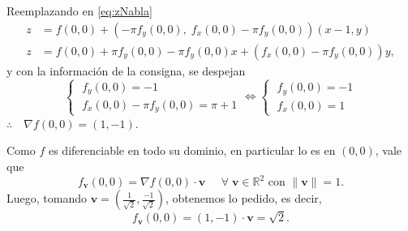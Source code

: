 \begin{solution}
Reemplazando en \eqref{eq:zNabla}
   \begin{align*}
    z&= f(0,0)+\left(-\pi f_y(0,0),\;f_x(0,0)-\pi f_y(0,0)\right) (x-1,y)\\
    z&=f(0,0)   +\pi f_y(0,0)   -  \pi f_y(0,0)x+(f_x(0,0)-\pi f_y(0,0))y,
   \end{align*}
y con la información de la consigna, se despejan
    \[\begin{cases}
        \;f_y(0,0)=-1\\[5pt]
        \;f_x(0,0)-\pi f_y(0,0)=\pi+1
    \end{cases}
    \iff 
    \begin{cases}
        \;f_y(0,0)=-1\\[5pt]
        \;f_x(0,0)=1
    \end{cases}
    \]
    $\therefore\quad\nabla f(0,0)=(1,-1)$.

Como $f$ es diferenciable en todo su dominio, en particular lo es en $(0,0)$, vale que  $$f_{\mathbf{v}}(0,0)=\nabla f(0,0)\cdot{\mathbf{v}}\;\;\;\;\;  \forall \; {\mathbf{v}} \in \mathbb{R}^{2}  \mbox{ con } \|{\mathbf{v}}\|=1. $$ Luego,  tomando  $ {\mathbf{v}} = (\frac{1}{\sqrt{2}},\frac{-1}{\sqrt{2}})$, obtenemos lo pedido, es decir,
\[
f_{{\mathbf{v}}} (0,0)=(1,-1)\cdot {\mathbf{v}}= \sqrt{2}.
\]
\end{solution}

